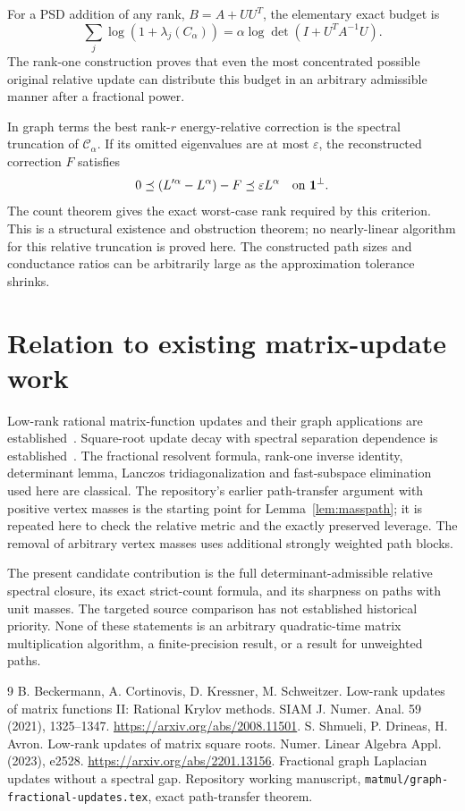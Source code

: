 \documentclass[11pt]{article}
\begin{document}
For a PSD addition of any rank, $B=A+UU^T$, the elementary exact budget is
\[
 \sum_j\log(1+\lambda_j(C_\alpha))
       =\alpha\log\det(I+U^TA^{-1}U).
\]
The rank-one construction proves that even the most concentrated
possible original relative update can distribute this budget in an
arbitrary admissible manner after a fractional power.

In graph terms the best rank-$r$ energy-relative correction is the
spectral truncation of $\mathcal C_\alpha$. If its omitted eigenvalues
are at most $\varepsilon$, the reconstructed correction $F$ satisfies
\[
 0\preceq (L'^\alpha-L^\alpha)-F\preceq\varepsilon L^\alpha
 \quad\hbox{on }\mathbf1^\perp.
\]
The count theorem gives the exact worst-case rank required by this
criterion. This is a structural existence and obstruction theorem;
no nearly-linear algorithm for this relative truncation is proved here.
The constructed path sizes and conductance ratios can be arbitrarily
large as the approximation tolerance shrinks.

\section{Relation to existing matrix-update work}
Low-rank rational matrix-function updates and their graph applications
are established~\cite{BCKS}. Square-root update decay with spectral
separation dependence is established~\cite{SDA}. The fractional
resolvent formula, rank-one inverse identity, determinant lemma,
Lanczos tridiagonalization and fast-subspace elimination used here
are classical. The repository's earlier path-transfer argument with
positive vertex masses is the starting point for
Lemma~\ref{lem:masspath}; it is repeated here to check the relative
metric and the exactly preserved leverage. The removal of arbitrary
vertex masses uses additional strongly weighted path blocks.

The present candidate contribution is the full determinant-admissible
relative spectral closure, its exact strict-count formula, and its
sharpness on paths with unit masses. The targeted source comparison
has not established historical priority. None of these statements is
an arbitrary quadratic-time matrix multiplication algorithm, a
finite-precision result, or a result for unweighted paths.

\begin{thebibliography}{9}
 B. Beckermann, A. Cortinovis, D. Kressner, M. Schweitzer.
Low-rank updates of matrix functions II: Rational Krylov methods.
SIAM J. Numer. Anal. 59 (2021), 1325--1347.
\url{https://arxiv.org/abs/2008.11501}.
 S. Shmueli, P. Drineas, H. Avron.
Low-rank updates of matrix square roots.
Numer. Linear Algebra Appl. (2023), e2528.
\url{https://arxiv.org/abs/2201.13156}.
 Fractional graph Laplacian updates without a spectral gap.
Repository working manuscript,
\texttt{matmul/graph-fractional-updates.tex}, exact path-transfer theorem.
\end{thebibliography}
\end{document}
